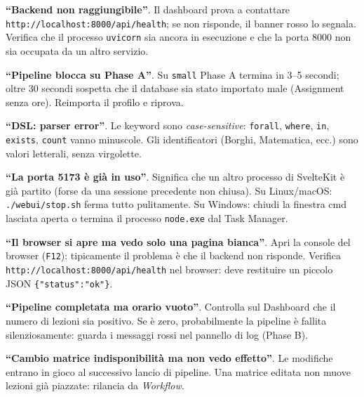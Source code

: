 \begin{erroricomunibox}
\textbf{``Backend non raggiungibile''}. Il dashboard prova a
contattare \texttt{http://localhost:8000/api/health}; se non
risponde, il banner rosso lo segnala. Verifica che il
processo \texttt{uvicorn} sia ancora in esecuzione e che la
porta 8000 non sia occupata da un altro servizio.

\textbf{``Pipeline blocca su Phase A''}. Su \texttt{small}
Phase A termina in 3--5 secondi; oltre 30 secondi sospetta
che il database sia stato importato male (Assignment senza
ore). Reimporta il profilo e riprova.

\textbf{``DSL: parser error''}. Le keyword sono
\emph{case-sensitive}: \texttt{forall}, \texttt{where},
\texttt{in}, \texttt{exists}, \texttt{count} vanno minuscole.
Gli identificatori (Borghi, Matematica, ecc.) sono valori
letterali, senza virgolette.

\textbf{``La porta 5173 \`e gi\`a in uso''}. Significa che un
altro processo di SvelteKit \`e gi\`a partito (forse da una
sessione precedente non chiusa). Su Linux/macOS:
\texttt{./webui/stop.sh} ferma tutto pulitamente. Su Windows:
chiudi la finestra cmd lasciata aperta o termina il processo
\texttt{node.exe} dal Task Manager.

\textbf{``Il browser si apre ma vedo solo una pagina bianca''}.
Apri la console del browser (\texttt{F12}): tipicamente il
problema \`e che il backend non risponde. Verifica
\texttt{http://localhost:8000/api/health} nel browser: deve
restituire un piccolo JSON \texttt{\{"status":"ok"\}}.

\textbf{``Pipeline completata ma orario vuoto''}. Controlla
sul Dashboard che il numero di lezioni sia positivo. Se \`e
zero, probabilmente la pipeline \`e fallita silenziosamente:
guarda i messaggi rossi nel pannello di log (Phase B).

\textbf{``Cambio matrice indisponibilit\`a ma non vedo
effetto''}. Le modifiche entrano in gioco al successivo lancio
di pipeline. Una matrice editata non muove lezioni gi\`a
piazzate: rilancia da \emph{Workflow}.
\end{erroricomunibox}
